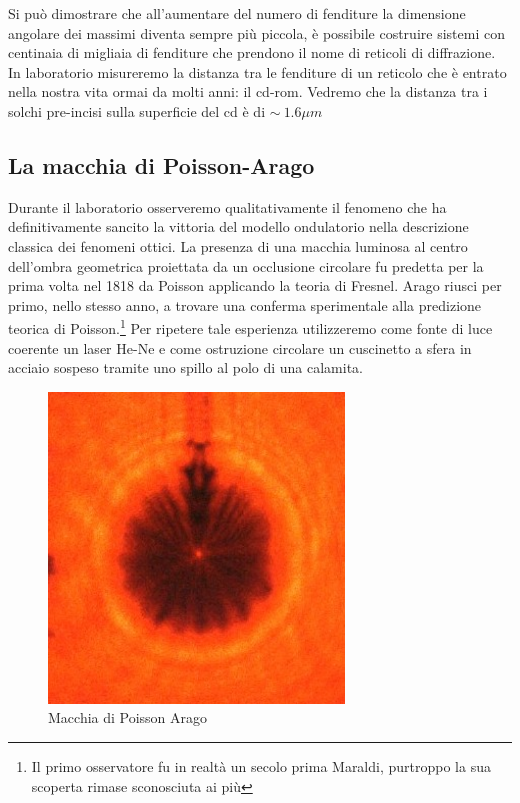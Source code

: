 \documentclass[a4paper,10pt,oneside]{article}
\begin{document}
Si può dimostrare che all'aumentare del numero di fenditure la dimensione angolare dei massimi diventa sempre più piccola, è possibile costruire sistemi con centinaia di migliaia di fenditure che prendono il nome di reticoli di diffrazione. In laboratorio misureremo la distanza tra le fenditure di un reticolo che è entrato nella nostra vita ormai da molti anni: il cd-rom. Vedremo che la distanza tra i solchi pre-incisi sulla superficie del cd è di $\sim\ 1.6\mu m$ 

\subsection*{La macchia di Poisson-Arago}
Durante il laboratorio osserveremo qualitativamente il fenomeno che ha definitivamente sancito la vittoria del modello ondulatorio nella descrizione classica dei fenomeni ottici. La presenza di una macchia luminosa al centro dell'ombra geometrica proiettata da un occlusione circolare fu predetta per la prima volta nel 1818 da Poisson applicando la teoria di Fresnel. Arago riusci per primo, nello stesso anno, a trovare una conferma sperimentale alla predizione teorica di Poisson.\footnote{Il primo osservatore fu in realtà un secolo prima Maraldi, purtroppo la sua scoperta rimase sconosciuta ai più} 
Per ripetere tale esperienza utilizzeremo come fonte di luce coerente un laser He-Ne e come ostruzione circolare un cuscinetto a sfera in acciaio sospeso tramite uno spillo al polo di una calamita.

\begin{figure}[H]
 \centering
 \includegraphics[width=0.7\textwidth]{./Immagini/poisson_spot3.jpg}
 \caption{Macchia di Poisson Arago}
 \label{fig:poisson_arago}
\end{figure}
\end{document}
